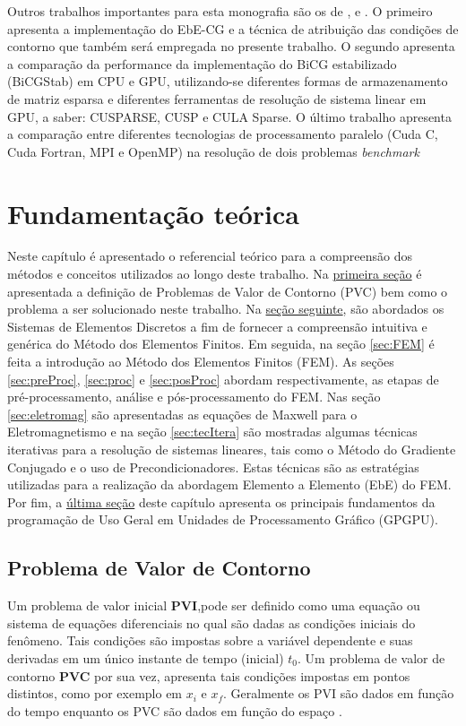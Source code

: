 \documentclass[
    12pt,               %
    openright,          %
    oneside,
    a4paper,            %
    english,            %
    french,             %
    spanish,            %
    brazil              %
    ]{abntex2}
\begin{document}
Outros trabalhos importantes para esta monografia são os de ,  e . O primeiro apresenta a implementação do EbE-CG e a técnica de atribuição das condições de contorno que também será empregada no presente trabalho. O segundo apresenta a comparação da performance da implementação do BiCG estabilizado (BiCGStab) em CPU e GPU, utilizando-se diferentes formas de armazenamento de matriz esparsa e diferentes ferramentas de resolução de sistema linear em GPU, a saber: CUSPARSE, CUSP e CULA Sparse. O último trabalho apresenta a comparação entre diferentes tecnologias de processamento paralelo (Cuda C, Cuda Fortran, MPI e OpenMP) na resolução de dois problemas \textit{benchmark}


\chapter{Fundamentação teórica}
Neste capítulo é apresentado o referencial teórico para a compreensão dos métodos e conceitos utilizados ao longo deste trabalho. 
Na \hyperref[sec:PVC]{primeira seção} é apresentada a definição de Problemas de Valor de Contorno (PVC) bem como o problema a ser solucionado neste trabalho. 
Na \hyperref[sec:SED]{seção seguinte}, são abordados os Sistemas de Elementos Discretos a fim de fornecer a compreensão intuitiva e genérica do Método dos Elementos Finitos.
Em seguida, na seção \ref{sec:FEM} é feita a introdução ao Método dos Elementos Finitos (FEM). 
As seções \ref{sec:preProc}, \ref{sec:proc} e \ref{sec:posProc} abordam respectivamente, as etapas de pré-processamento, análise e pós-processamento do FEM.
Nas seção \ref{sec:eletromag} são apresentadas as equações de Maxwell para o Eletromagnetismo e na seção \ref{sec:tecItera} são mostradas algumas técnicas iterativas para a resolução de sistemas lineares, tais como o Método do Gradiente Conjugado e o uso de Precondicionadores. Estas técnicas são as estratégias utilizadas para a realização da abordagem Elemento a Elemento (EbE) do FEM.
Por fim, a \hyperref[sec:GPGPU]{última seção} deste capítulo apresenta os principais fundamentos da programação de Uso Geral em Unidades de Processamento Gráfico (GPGPU).

\section{Problema de Valor de Contorno}
\label{sec:PVC}


Um problema de valor inicial \textbf{PVI},pode ser definido como uma equação ou sistema de equações diferenciais no qual são dadas as condições iniciais do fenômeno. Tais condições são impostas sobre a variável dependente e suas derivadas em um único instante de tempo (inicial) $t_0$. Um problema de valor de contorno \textbf{PVC} por sua vez, apresenta tais condições impostas em pontos distintos, como por exemplo em $x_i$ e $x_f$. Geralmente os PVI são dados em função do tempo enquanto os PVC são dados em função do espaço \cite{boyceDiprima}.
\end{document}
